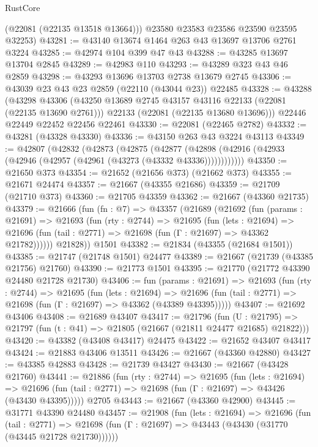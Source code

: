 \begin{lexlean}{RustCore}
\begin{coremodule}
        (@22081 (@22135 @13518 @13664)))
      @23580
      @23583
      @23586
      @23590
      @23595
      @32253)
@43281 := @43140 @13674 @1464 @263 @43 @13697 @13706 @2761 @3224
@43285 := @42974 @104 @399 @47 @43
@43288 := @43285 @13697 @13704 @2845
@43289 := @42983 @110
@43293 := @43289 @323 @43 @46 @2859
@43298 := @43293 @13696 @13703 @2738 @13679 @2745
@43306 := @43039 @23 @43 @23 @2859 (@22110 (@43044 @23)) @22485
@43328 := @43288
    (@43298
      @43306
      (@43250 @13689 @2745 @43157 @43116 @22133 (@22081 (@22135 @13690 @2761)))
      @22133
      (@22081 (@22135 @13680 @13696)))
    @22446
    @22449
    @22452
    @22456
    @22461
@43330 := @22081 (@22465 @2782)
@43332 := @43281 (@43328 @43330)
@43336 := @43150 @263 @43 @3224 @43113
@43349 := @42807
    (@42832
      (@42873
        (@42875
          (@42877 (@42898 (@42916 (@42933 (@42946 (@42957 (@42961 (@43273 (@43332 @43336))))))))))))
@43350 := @21650 @373
@43354 := @21652 (@21656 @373) (@21662 @373)
@43355 := @21671 @24474
@43357 := @21667 (@43355 @21686)
@43359 := @21709 (@21710 @373)
@43360 := @21705 @43359
@43362 := @21667 (@43360 @21735)
@43379 := @21666
    (fun (fn : @7) =>
    @43357
      (@21689
        (@21692
          (fun (params : @21691) =>
          @21693
            (fun (rty : @2744) =>
            @21695
              (fun (lets : @21694) =>
              @21696 (fun (tail : @2771) => @21698 (fun (Γ : @21697) => @43362 @21782))))))
        @21828))
    @1501
@43382 := @21834 (@43355 (@21684 @1501))
@43385 := @21747 (@21748 @1501) @24477
@43389 := @21667 (@21739 (@43385 @21756) @21760)
@43390 := @21773 @1501
@43395 := @21770 (@21772 @43390 @24480 @21728 @21730)
@43406 := fun (params : @21691) =>
  @21693
    (fun (rty : @2744) =>
    @21695
      (fun (lets : @21694) =>
      @21696 (fun (tail : @2771) => @21698 (fun (Γ : @21697) => @43362 (@43389 @43395)))))
@43407 := @21692 @43406
@43408 := @21689 @43407
@43417 := @21796
    (fun (U : @21795) => @21797 (fun (t : @41) => @21805 (@21667 (@21811 @24477 @21685) @21822)))
@43420 := @43382 (@43408 @43417) @24475
@43422 := @21652 @43407 @43417
@43424 := @21883 @43406 @13511
@43426 := @21667 (@43360 @42880)
@43427 := @43385 @42883
@43428 := @21739 @43427
@43430 := @21667 (@43428 @21760)
@43441 := @21886
    (fun (rty : @2744) =>
    @21695
      (fun (lets : @21694) =>
      @21696 (fun (tail : @2771) => @21698 (fun (Γ : @21697) => @43426 (@43430 @43395)))))
    @2705
@43443 := @21667 (@43360 @42900)
@43445 := @31771 @43390 @24480
@43457 := @21908
    (fun (lets : @21694) =>
    @21696
      (fun (tail : @2771) =>
      @21698 (fun (Γ : @21697) => @43443 (@43430 (@31770 (@43445 @21728 @21730))))))

\end{coremodule}
\end{lexlean}
